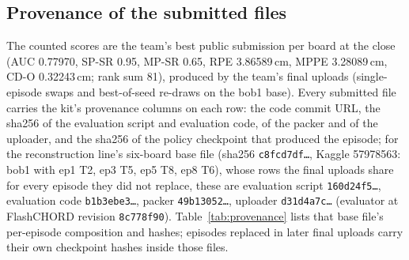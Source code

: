 \subsection{Provenance of the submitted files}
\label{app:provenance}
The counted scores are the team's best public submission per board at the close (AUC 0.77970, SP-SR 0.95, MP-SR 0.65, RPE 3.86589\,cm, MPPE 3.28089\,cm, CD-O 0.32243\,cm; rank sum 81), produced by the team's final uploads (single-episode swaps and best-of-seed re-draws on the bob1 base). Every submitted file carries the kit's provenance columns on each row: the code commit URL, the sha256 of the evaluation script and evaluation code, of the packer and of the uploader, and the sha256 of the policy checkpoint that produced the episode; for the reconstruction line's six-board base file (sha256 \texttt{c8fcd7df\ldots}, Kaggle 57978563: bob1 with ep1 T2, ep3 T5, ep5 T8, ep8 T6), whose rows the final uploads share for every episode they did not replace, these are evaluation script \texttt{160d24f5\ldots}, evaluation code \texttt{b1b3ebe3\ldots}, packer \texttt{49b13052\ldots}, uploader \texttt{d31d4a7c\ldots} (evaluator at FlashCHORD revision \texttt{8c778f90}). Table~\ref{tab:provenance} lists that base file's per-episode composition and hashes; episodes replaced in later final uploads carry their own checkpoint hashes inside those files.

